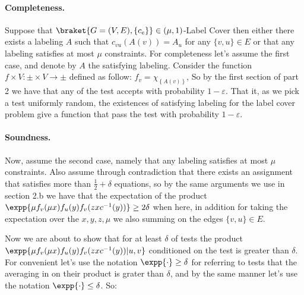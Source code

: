 \documentclass{article}
\newcommand{\Chi}[1]{\chi_{ \left\{ #1  \right\} } }
\begin{document}
\paragraph{Completeness. } Suppose that $\braket{G=(V,E), \{ c_{e} \} } \in (\mu,1)$-Label Cover then either there exists a labeling $A$ such that $c_{vu}(A(v)) = A_{u}$ for any $\{v,u\}\in E$ or that any labeling satisfies at most $\mu$ constraints. For completeness let's assume the first case, and denote by $A$ the satisfying labeling. Consider the function $f \times V : \pm \times V \rightarrow \pm$ defined as follow: $f_{v} = \Chi{A(v)}$, So by the first section of part 2 we have that any of the test accepts with probability $1-\varepsilon$. That it, as we pick a test uniformly random, the existences of satisfying labeling for the label cover problem give a function that pass the test with probability $1-\varepsilon$. 
\paragraph{Soundness.} Now, assume the second case, namely that any labeling satisfies at most $\mu$ constraints. Also assume through contradiction that there exists an assignment that satisfies more than $\frac{1}{2}+\delta$ equations, so by the same arguments we use in section 2.b we have that the expectation of the product $ \expp{\mu f_{v}(\mu x )f_{u}(y)f_{v}(zx c^{-1}(y))} \ge 2 \delta$ when here, in addition for taking the expectation over the $x,y,z,\mu$ we also summing on the edges $\{v,u\}\in E$. 

Now we are about to show that for at least $\delta$ of tests the product $ \expp{\mu f_{v}(\mu x )f_{u}(y)f_{v}(zx c^{-1}(y)) | u,v }$ conditioned on the test is greater than $\delta$. For convenient let's use the notation $\expp{ \cdot } \ge \delta$ for referring to tests that the averaging in on their product is grater than $\delta$, and by the same manner let's use the notation $\expp{\cdot } \le \delta$. So:   
\end{document}
